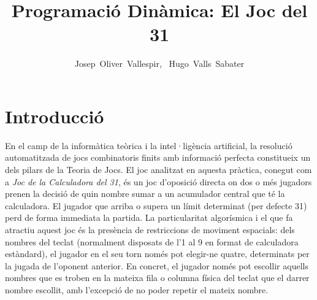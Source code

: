 \documentclass[compsoc, a4paper]{IEEEtran}
\begin{document}
\title{Programació Dinàmica: El Joc del 31}

\author{Josep~Oliver~Vallespir, ~Hugo~Valls~Sabater%
%
}


\maketitle
\IEEEdisplaynontitleabstractindextext
\IEEEpeerreviewmaketitle

\section{Introducció}

En el camp de la informàtica teòrica i la intel·ligència artificial, la resolució automatitzada de jocs combinatoris finits amb informació perfecta constitueix un dels pilars de la Teoria de Jocs. El joc analitzat en aquesta pràctica, conegut com a \textit{Joc de la Calculadora del 31}, és un joc d'oposició directa on dos o més jugadors prenen la decisió de quin nombre sumar a un acumulador central que té la calculadora. El jugador que arriba o supera un límit determinat (per defecte 31) perd de forma immediata la partida. La particularitat algorísmica i el que fa atractiu aquest joc és la presència de restriccions de moviment espacials: dels nombres del teclat (normalment disposats de l'1 al 9 en format de calculadora estàndard), el jugador en el seu torn només pot elegir-ne quatre, determinats per la jugada de l'oponent anterior. En concret, el jugador només pot escollir aquells nombres que es troben en la mateixa fila o columna física del teclat que el darrer nombre escollit, amb l'excepció de no poder repetir el mateix nombre.
\end{document}
